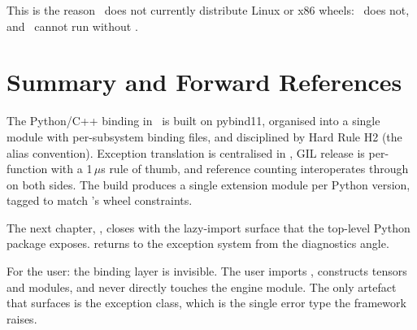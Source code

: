 This is the reason \Lucid\ does not currently distribute Linux or
x86 wheels: \MLX\ does not, and \Lucid\ cannot run without \MLX.

\section{Summary and Forward References}
\label{sec:python_cpp_binding:summary}

The Python/C++ binding in \Lucid\ is built on pybind11, organised
into a single  module with per-subsystem binding
files, and disciplined by Hard Rule H2 (the 
alias convention). Exception translation is centralised in
, GIL release is per-function with a
1\,$\mu$s rule of thumb, and reference counting interoperates
through  on both sides. The build
produces a single extension module per Python version, tagged to
match \MLX's wheel constraints.

The next chapter, , closes
 with the lazy-import surface that the
top-level Python package exposes. 
returns to the exception system from the diagnostics angle.

\begin{lucidnote}
For the user: the binding layer is invisible. The user imports
, constructs tensors and modules, and never directly
touches the engine module. The only artefact that surfaces is the
 exception class, which is the single error type
the framework raises.
\end{lucidnote}

